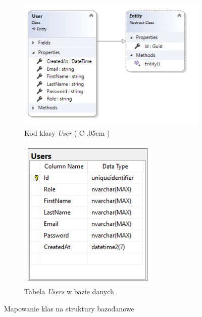 \documentclass[12pt]{article}
\newcommand{\Csharp}{%
  {\settoheight{\dimen0}{C}C\kern-.05em \resizebox{!}{\dimen0}{\raisebox{\depth}{\# }}}}
\numberwithin{figure}{section}
\begin{document}
\begin{sloppypar}
\begin{figure}[htbp]
    \centering
    \begin{subfigure}{.6\textwidth}
      \centering
      \includegraphics[width=1\linewidth]{images/chapter_3/ef-code.png}
      \caption{Kod klasy \textit{User} (\Csharp)}
      \label{fig:ef-code}
    \end{subfigure}%
    \begin{subfigure}{.4\textwidth}
      \centering
      \includegraphics[width=1\linewidth]{images/chapter_3/ef-db.png}
      \caption{Tabela \textit{Users} w bazie danych}
      \label{fig:ef-db}
    \end{subfigure}
    \caption{Mapowanie klas na struktury bazodanowe}
    \label{fig:ef}
\end{figure}
    

\end{sloppypar}
\end{document}

